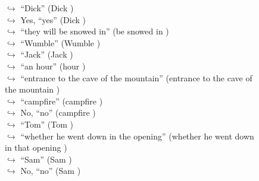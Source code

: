 \documentclass[11pt,a4paper, onecolumn]{article}
\begin{document}
\begin{figure}[t] \small \begin{tcolorbox}[boxsep=0pt,left=5pt,right=0pt,top=2pt,colback = yellow!5] \begin{dialogue}
 \small 
\colorbox{pink!25}{$\hookrightarrow$}
{ ``Dick'' (Dick ) }
\\
\colorbox{pink!25}{$\hookrightarrow$}
\colorbox{red!25}{Yes,}
{ ``yes'' (Dick ) }
\\
\colorbox{pink!25}{$\hookrightarrow$}
{ ``they will be snowed in'' (be snowed in ) }
\\
\colorbox{pink!25}{$\hookrightarrow$}
{ ``Wumble'' (Wumble ) }
\\
\colorbox{pink!25}{$\hookrightarrow$}
{ ``Jack'' (Jack ) }
\\
\colorbox{pink!25}{$\hookrightarrow$}
{ ``an hour'' (hour ) }
\\
\colorbox{pink!25}{$\hookrightarrow$}
{ ``entrance to the cave of the mountain'' (entrance to the cave of the mountain ) }
\\
\colorbox{pink!25}{$\hookrightarrow$}
{ ``campfire'' (campfire ) }
\\
\colorbox{pink!25}{$\hookrightarrow$}
\colorbox{red!25}{No,}
{ ``no'' (campfire ) }
\\
\colorbox{pink!25}{$\hookrightarrow$}
{ ``Tom'' (Tom ) }
\\
\colorbox{pink!25}{$\hookrightarrow$}
{ ``whether he went down in the opening'' (whether he went down in that opening ) }
\\
\colorbox{pink!25}{$\hookrightarrow$}
{ ``Sam'' (Sam ) }
\\
\colorbox{pink!25}{$\hookrightarrow$}
\colorbox{red!25}{No,}
{ ``no'' (Sam ) }
\\

\end{dialogue}
\end{tcolorbox}
\end{figure}
\end{document}
